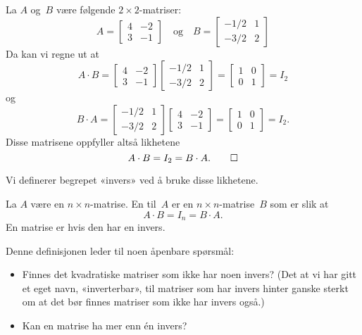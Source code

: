 \begin{ex}
\label{ex:invers}
La $A$ og~$B$ være følgende $2 \times 2$-matriser:
\[
A =
\begin{bmatrix}
 4 & -2 \\
 3 & -1
\end{bmatrix}
\quad\text{og}\quad
B =
\begin{bmatrix}
-1/2 & 1 \\
-3/2 & 2
\end{bmatrix}
\]
Da kan vi regne ut at
\[
A \cdot B
= 
\begin{bmatrix}
 4 & -2 \\
 3 & -1
\end{bmatrix}
\begin{bmatrix}
-1/2 & 1 \\
-3/2 & 2
\end{bmatrix}
=
\begin{bmatrix}
1 & 0 \\
0 & 1
\end{bmatrix}
= I_2
\]
og
\[
B \cdot A
= 
\begin{bmatrix}
-1/2 & 1 \\
-3/2 & 2
\end{bmatrix}
\begin{bmatrix}
 4 & -2 \\
 3 & -1
\end{bmatrix}
=
\begin{bmatrix}
1 & 0 \\
0 & 1
\end{bmatrix}
= I_2.
\]
Disse matrisene oppfyller altså likhetene
\[
A \cdot B = I_2 = B \cdot A.\qedhere
\]
\end{ex}

Vi definerer begrepet «invers» ved å bruke disse likhetene.

\begin{defn}
La $A$ være en $n \times n$-matrise.  En  til~$A$ er
en $n \times n$-matrise~$B$ som er slik at
\[
A \cdot B = I_n = B \cdot A.
\]
En matrise er  hvis den har en invers.
\end{defn}

Denne definisjonen leder til noen åpenbare spørsmål:
\begin{itemize}
\item Finnes det kvadratiske matriser som ikke har noen invers?  (Det
at vi har gitt et eget navn, «inverterbar», til matriser som har
invers hinter ganske sterkt om at det bør finnes matriser som ikke har
invers også.)
\item Kan en matrise ha mer enn én invers?
\end{itemize}

